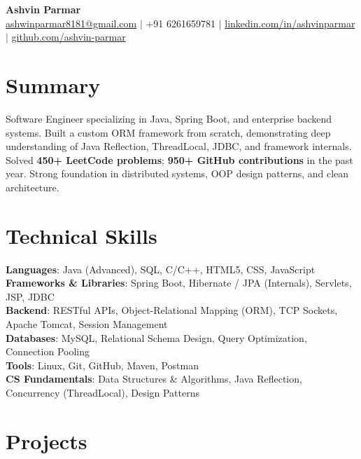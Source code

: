 \documentclass[a4paper,10pt]{article}
\begin{document}
\begin{center}
    {\LARGE \textbf{Ashvin Parmar}}\\
    \vspace{1mm}
    \href{mailto:ashwinparmar8181@gmail.com}{ashwinparmar8181@gmail.com} $|$
    +91 6261659781 $|$
    \href{https://www.linkedin.com/in/ashvinparmar/}{linkedin.com/in/ashvinparmar} $|$
    \href{https://github.com/ashvin-parmar}{github.com/ashvin-parmar}
\end{center}

\section*{Summary}
Software Engineer specializing in Java, Spring Boot, and enterprise backend systems. Built a custom ORM framework from scratch, demonstrating deep understanding of Java Reflection, ThreadLocal, JDBC, and framework internals. Solved \textbf{450+ LeetCode problems}; \textbf{950+ GitHub contributions} in the past year. Strong foundation in distributed systems, OOP design patterns, and clean architecture.

\section*{Technical Skills}
\textbf{Languages}: Java (Advanced), SQL, C/C++, HTML5, CSS, JavaScript \\
\textbf{Frameworks \& Libraries}: Spring Boot, Hibernate / JPA (Internals), Servlets, JSP, JDBC \\
\textbf{Backend}: RESTful APIs, Object-Relational Mapping (ORM), TCP Sockets, Apache Tomcat, Session Management \\
\textbf{Databases}: MySQL, Relational Schema Design, Query Optimization, Connection Pooling \\
\textbf{Tools}: Linux, Git, GitHub, Maven, Postman \\
\textbf{CS Fundamentals}: Data Structures \& Algorithms, Java Reflection, Concurrency (ThreadLocal), Design Patterns

\section*{Projects}
\end{document}

